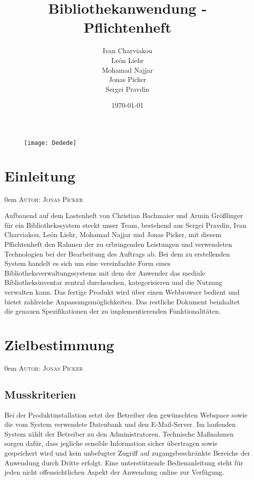 \documentclass{article}
\title{Bibliothekanwendung - Pflichtenheft}
\date{\today}
\author{
	Ivan Charviakou\\
	León Liehr\\
	Mohamad Najjar\\
	Jonas Picker\\
	Sergei Pravdin
}
\makeatletter
\newcommand{\sectionauthor}[1]{
	{\parindent 0em \large \scshape Autor: #1 \par \nobreak \vspace*{2em}}
	\@afterheading
}
\makeatother
\begin{document}
\maketitle
\begin{figure}[h]
	\centering
	\texttt{[image: Dedede]}
\end{figure}
\newpage

\section{Einleitung} %
\sectionauthor{Jonas Picker}
Aufbauend auf dem Lastenheft von Christian Bachmaier und Armin Größlinger für ein Bibliothekssystem steckt unser Team, bestehend aus Sergei Pravdin, Ivan Charviakou, León Liehr, Mohamad Najjar und Jonas Picker, mit diesem Pflichtenheft den Rahmen der zu erbringenden Leistungen und verwendeten Technologien bei der Bearbeitung des Auftrags ab. Bei dem zu erstellenden System handelt es sich um eine vereinfachte Form eines Bibliotheksverwaltungssystems mit dem der Anwender das mediale Bibliotheksinventar zentral durchsuchen, kategorisieren und die Nutzung verwalten kann. Das fertige Produkt wird über einen Webbrowser bedient und bietet zahlreiche Anpassungsmöglichkeiten. Das restliche Dokument beinhaltet die genauen Spezifikationen der zu implementierenden Funktionalitäten.
\newpage

\section{Zielbestimmung} %
\sectionauthor{Jonas Picker}

\subsection{Musskriterien}
Bei der Produktinstallation setzt der Betreiber den gewünschten Webspace sowie die vom System verwendete Datenbank und den E-Mail-Server. Im laufenden System zählt der Betreiber zu den Administratoren. Technische Maßnahmen sorgen dafür, dass jegliche sensible Information sicher übertragen sowie gespeichert wird und kein unbefugter Zugriff auf zugangsbeschränkte Bereiche der Anwendung durch Dritte erfolgt. Eine unterstützende Bedienanleitung steht für jeden nicht offensichtlichen Aspekt der Anwendung online zur Verfügung.
\end{document}
